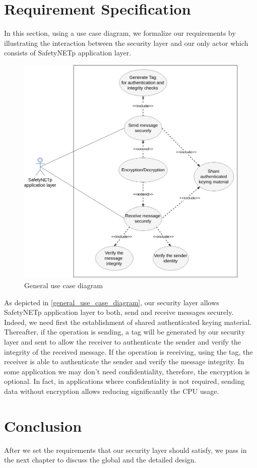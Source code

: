 \section{Requirement Specification}

In this section, using a use case diagram, we formalize our requirements by illustrating the interaction between the security layer
and our only actor which consists of SafetyNETp application layer.

\begin{figure}[H]
\centering
\includegraphics[width=13cm]{figures/requirements/use_case.jpg}
\caption{General use case diagram}\label{general_use_case_diagram}
\end{figure}

As depicted in \autoref{general_use_case_diagram}, our security layer allows SafetyNETp application layer to both, send and receive messages securely.
Indeed, we need first the establishment of shared authenticated keying material. Thereafter, if the operation
is sending, a tag will be generated by our security layer and sent to allow the receiver to authenticate the sender and verify the integrity of
the received message. If the operation is receiving, using the tag, the receiver is able to authenticate the sender and verify the message integrity.
In some application we may don't need confidentiality, therefore, the encryption is optional. In fact, in applications where
confidentiality is not required, sending data without encryption allows reducing significantly the CPU usage.

\section*{Conclusion}

After we set the requirements that our security layer should satisfy, we pass in the next chapter to discuss
the global and the detailed design.
